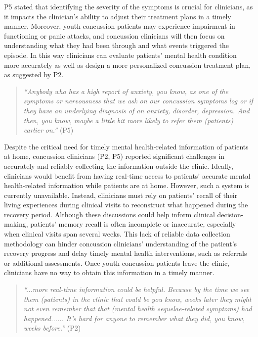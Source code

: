 P5 stated that identifying the severity of the symptoms is crucial for clinicians, as it impacts the clinician's ability to adjust their treatment plans in a timely manner.
Moreover, youth concussion patients may experience impairment in functioning or panic attacks, and concussion clinicians will then focus on understanding what they had been through and what events triggered the episode. In this way clinicians can evaluate patients' mental health condition more accurately as well as design a more personalized concussion treatment plan, as suggested by P2. 
\begin{quote}
    \textit{``Anybody who has a high report of anxiety, you know, as one of the symptoms or nervousness that we ask on our concussion symptoms log or if they have an underlying diagnosis of an anxiety, disorder, depression. And then, you know, maybe a little bit more likely to refer them (patients) earlier on.''} (P5)
\end{quote}


Despite the critical need for timely mental health-related information of patients at home, concussion clinicians (P2, P5) reported significant challenges in accurately and reliably collecting the information outside the clinic.
Ideally, clinicians would benefit from having real-time access to patients’ accurate mental health-related information while patients are at home. 
However, such a system is currently unavailable.
Instead, clinicians must rely on patients’ recall of their living experiences during clinical visits to reconstruct what happened during the recovery period. 
Although these discussions could help inform clinical decision-making, patients’ memory recall is often incomplete or inaccurate, especially when clinical visits span several weeks. 
This lack of reliable data collection methodology can hinder concussion clinicians’ understanding of the patient’s recovery progress and delay timely mental health interventions, such as referrals or additional assessments.
Once youth concussion patients leave the clinic, clinicians have no way to obtain this information in a timely manner.
\begin{quote}
    \textit{``...more real-time information could be helpful. Because by the time we see them (patients) in the clinic that could be you know, weeks later they might not even remember that that (mental health sequelae-related symptoms) had happened...... It's hard for anyone to remember what they did, you know, weeks before.''} (P2)
\end{quote}


